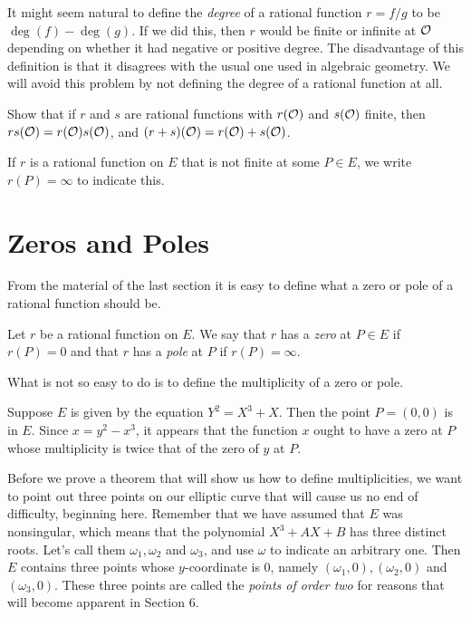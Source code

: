 \rem
It might seem natural to define the {\it degree} of a rational function $r=f/g$ to be $\deg(f)-\deg(g)$. If we did this, then $r$ would be finite or infinite at $\mathcal{O}$ depending on whether it had negative or positive degree. The disadvantage of this definition is that it disagrees with the usual one used in algebraic geometry. We will avoid this problem by not defining the degree of a rational function at all.


\begin{exo}
Show that if $r$ and $s$ are rational functions with $r(\mathcal{O})$ and $s(\mathcal{O})$ finite, then $rs(\mathcal{O})=r(\mathcal{O})s(\mathcal{O})$, and $(r+s)(\mathcal{O})=r(\mathcal{O})+s(\mathcal{O})$.
\end{exo}

If $r$ is a rational function on $E$ that is not finite at some $P\in E$, we write $ r(P)=\infty$ to indicate this.

\section{Zeros and Poles}

From the material of the last section it is easy to define what a zero or pole of a rational function should be.

\begin{defi}
\label{d4.1}
Let $r$ be a rational function on $E$. We say that $r$ has a {\it zero} at $P\in E$ if $r(P)=0$ and that $r$ has a {\it pole} at $P$ if $ r(P)=\infty$.
\end{defi}

What is not so easy to do is to define the multiplicity of a zero or pole.

\begin{example}
\label{e4.2}
Suppose $E$ is given by the equation $Y^{2}=X^{3}+X$. Then the point $P=(0, 0)$ is in $E$. Since $x=y^{2}-x^{3}$, it appears that the function $x$ ought to have a zero at $P$ whose multiplicity is twice that of the zero of $y$ at $P$.
\end{example}

Before we prove a theorem that will show us how to define multiplicities, we want to point out three points on our elliptic curve that will cause us no end of difficulty, beginning here. Remember that we have assumed that $E$ was nonsingular, which means that the polynomial $X^{3}+AX+B$ has three distinct roots. Let's call them $\omega_{1},\omega_{2}$ and $\omega_{3}$, and use $\omega$ to indicate an arbitrary one. Then $E$ contains three points whose $y$-coordinate is $0$, namely $(\omega_{1},0),(\omega_{2},0)$ and $(\omega_{3},0)$. These three points are called the {\it points of order two} for reasons that will become apparent in Section 6.

